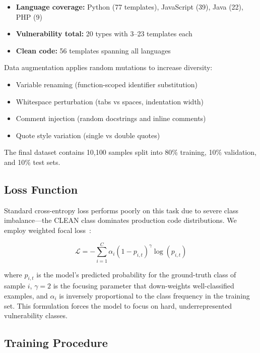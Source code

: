 \documentclass[conference,compsoc]{IEEEtran}
\begin{document}
\begin{itemize}
    \item \textbf{Language coverage:} Python (77 templates), JavaScript (39), Java (22), PHP (9)
    \item \textbf{Vulnerability total:} 20 types with 3--23 templates each
    \item \textbf{Clean code:} 56 templates spanning all languages
\end{itemize}

Data augmentation applies random mutations to increase diversity:
\begin{itemize}
    \item Variable renaming (function-scoped identifier substitution)
    \item Whitespace perturbation (tabs vs spaces, indentation width)
    \item Comment injection (random docstrings and inline comments)
    \item Quote style variation (single vs double quotes)
\end{itemize}

The final dataset contains 10,100 samples split into 80\% training, 10\% validation, and 10\% test sets.

\subsection{Loss Function}

Standard cross-entropy loss performs poorly on this task due to severe class imbalance---the CLEAN class dominates production code distributions. We employ weighted focal loss~\cite{lin2017}:

\begin{equation}
\mathcal{L} = -\sum_{i=1}^{C} \alpha_i (1-p_{i,t})^\gamma \log(p_{i,t})
\end{equation}

where $p_{i,t}$ is the model's predicted probability for the ground-truth class of sample $i$, $\gamma = 2$ is the focusing parameter that down-weights well-classified examples, and $\alpha_i$ is inversely proportional to the class frequency in the training set. This formulation forces the model to focus on hard, underrepresented vulnerability classes.

\subsection{Training Procedure}
\end{document}
